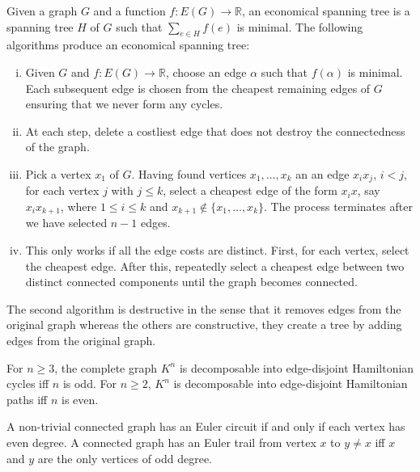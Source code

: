 \begin{ftheo}
Given a graph $G$ and a function $f:E(G)\to\mathbb{R}$, an economical spanning tree is a spanning tree $H$ of $G$ such that $\sum_{e\in H}f(e)$ is minimal. The following algorithms produce an economical spanning tree:
\begin{enumerate}[(i)]
    \item Given $G$ and $f:E(G)\to\mathbb{R}$, choose an edge $\alpha$ such that $f(\alpha)$ is minimal. Each subsequent edge is chosen from the cheapest remaining edges of $G$ ensuring that we never form any cycles.
    
    \item At each step, delete a costliest edge that does not destroy the connectedness of the graph.
    
    \item Pick a vertex $x_1$ of $G$. Having found vertices $x_1,\ldots,x_k$ an an edge $x_ix_j$, $i<j$, for each vertex $j$ with $j\leq k$, select a cheapest edge of the form $x_ix$, say $x_ix_{k+1}$, where $1\leq i\leq k$ and $x_{k+1}\not\in\{x_1,\ldots,x_k\}$. The process terminates after we have selected $n-1$ edges.
    
    \item This only works if all the edge costs are distinct. First, for each vertex, select the cheapest edge. After this, repeatedly select a cheapest edge between two distinct connected components until the graph becomes connected.
\end{enumerate}
\end{ftheo}

The second algorithm is destructive in the sense that it removes edges from the original graph whereas the others are constructive, they create a tree by adding edges from the original graph.

\begin{theorem}
For $n\geq 3$, the complete graph $K^n$ is decomposable into edge-disjoint Hamiltonian cycles iff $n$ is odd. For $n\geq 2$, $K^n$ is decomposable into edge-disjoint Hamiltonian paths iff $n$ is even.
\end{theorem}

\begin{ftheo}
A non-trivial connected graph has an Euler circuit if and only if each vertex has even degree. A connected graph has an Euler trail from vertex $x$ to $y\neq x$ iff $x$ and $y$ are the only vertices of odd degree.
\end{ftheo}


